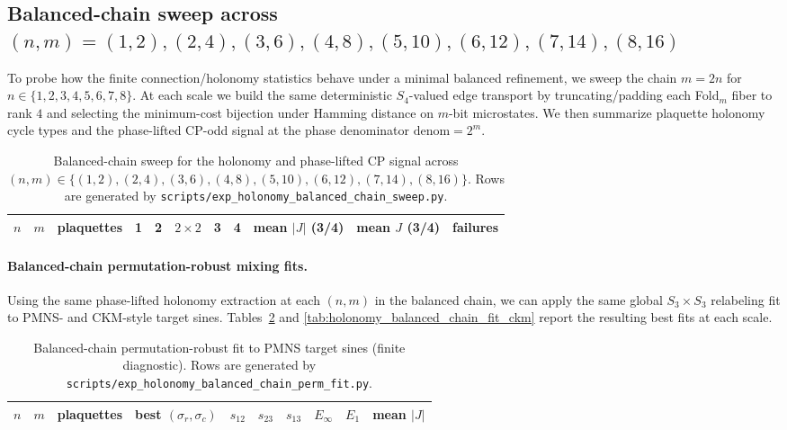 \subsection[Balanced-chain sweep]{Balanced-chain sweep across \texorpdfstring{$(n,m)=(1,2),(2,4),(3,6),(4,8),(5,10),(6,12),(7,14),(8,16)$}{(n,m)=(1,2),(2,4),(3,6),(4,8),(5,10),(6,12),(7,14),(8,16)}}
\label{subsec:holonomy_balanced_chain_sweep}

To probe how the finite connection/holonomy statistics behave under a minimal balanced refinement, we sweep the chain $m=2n$ for $n\in\{1,2,3,4,5,6,7,8\}$.
At each scale we build the same deterministic $S_4$-valued edge transport by truncating/padding each Fold$_m$ fiber to rank $4$ and selecting the minimum-cost bijection under Hamming distance on $m$-bit microstates.
We then summarize plaquette holonomy cycle types and the phase-lifted CP-odd signal at the phase denominator $\mathrm{denom}=2^m$.

\begin{table}[t]
\centering
\scriptsize
\setlength{\tabcolsep}{4pt}
\renewcommand{\arraystretch}{1.15}
\begin{tabular}{rrrrrrrrrrr}
\toprule
$n$ & $m$ & plaquettes &
1 & 2 & $2\times 2$ & 3 & 4 &
mean $|J|$ (3/4) & mean $J$ (3/4) & failures \\
\midrule
%
\end{tabular}
\caption{Balanced-chain sweep for the holonomy and phase-lifted CP signal across $(n,m)\in\{(1,2),(2,4),(3,6),(4,8),(5,10),(6,12),(7,14),(8,16)\}$. Rows are generated by \texttt{scripts/exp\_holonomy\_balanced\_chain\_sweep.py}.}
\label{tab:holonomy_balanced_chain_sweep}
\end{table}

\paragraph{Balanced-chain permutation-robust mixing fits.}
Using the same phase-lifted holonomy extraction at each $(n,m)$ in the balanced chain, we can apply the same global $S_3\times S_3$ relabeling fit to PMNS- and CKM-style target sines.
Tables~\ref{tab:holonomy_balanced_chain_fit_pmns} and \ref{tab:holonomy_balanced_chain_fit_ckm} report the resulting best fits at each scale.

\begin{table}[t]
\centering
\scriptsize
\setlength{\tabcolsep}{4pt}
\renewcommand{\arraystretch}{1.15}
\begin{tabular}{rrrrrrrrrr}
\toprule
$n$ & $m$ & plaquettes & best $(\sigma_r,\sigma_c)$ & $s_{12}$ & $s_{23}$ & $s_{13}$ & $E_\infty$ & $E_1$ & mean $|J|$ \\
\midrule
%
\end{tabular}
\caption{Balanced-chain permutation-robust fit to PMNS target sines (finite diagnostic). Rows are generated by \texttt{scripts/exp\_holonomy\_balanced\_chain\_perm\_fit.py}.}
\label{tab:holonomy_balanced_chain_fit_pmns}
\end{table}

